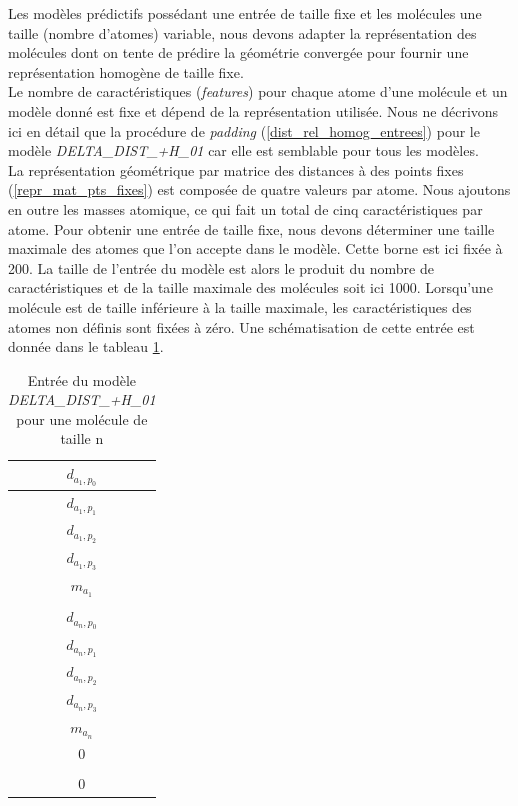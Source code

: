 Les modèles prédictifs possédant une entrée de taille fixe et les molécules une taille (nombre d'atomes) variable, nous devons adapter la représentation des molécules dont on tente de prédire la géométrie convergée pour fournir une représentation homogène de taille fixe.\\
Le nombre de caractéristiques (\emph{features}) pour chaque atome d'une molécule et un modèle donné est fixe et dépend de la représentation utilisée. Nous ne décrivons ici en détail que la procédure de \emph{padding} (\ref{dist_rel_homog_entrees}) pour le modèle \emph{DELTA\_DIST\_+H\_01} car elle est semblable pour tous les modèles.\\
La représentation géométrique par matrice des distances à des points fixes (\ref{repr_mat_pts_fixes}) est composée de quatre valeurs par atome. Nous ajoutons en outre les masses atomique, ce qui fait un total de cinq caractéristiques par atome. Pour obtenir une entrée de taille fixe, nous devons déterminer une taille maximale des atomes que l'on accepte dans le modèle. Cette borne est ici fixée à 200. La taille de l'entrée du modèle est alors le produit du nombre de caractéristiques et de la taille maximale des molécules soit ici 1000. Lorsqu'une molécule est de taille inférieure à la taille maximale, les caractéristiques des atomes non définis sont fixées à zéro. Une schématisation de cette entrée est donnée dans le tableau \ref{t_entree_delta_dist}.

\begin{table}
	\centering
	
	\begin{tabular}{|c|}
		\hline
		$d_{a_1,p_0}$ \\ \hline
		$d_{a_1,p_1}$ \\ \hline
		$d_{a_1,p_2}$ \\ \hline
		$d_{a_1,p_3}$ \\ \hline
		$m_{a_1}$ \\ \hline
		\rot{... } \\ \hline
		$d_{a_n,p_0}$ \\ \hline
		$d_{a_n,p_1}$ \\ \hline
		$d_{a_n,p_2}$ \\ \hline
		$d_{a_n,p_3}$ \\ \hline
		$m_{a_n}$ \\ \hline
		0 \\ \hline
		\rot{... } \\ \hline
		0 \\ \hline		
	\end{tabular}

	\caption{Entrée du modèle \emph{DELTA\_DIST\_+H\_01} pour une molécule de taille n}
	\label{t_entree_delta_dist}
\end{table}


